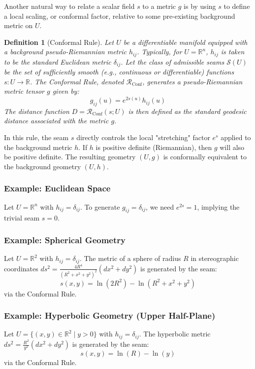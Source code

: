 \documentclass[twoside,twocolumn]{article}
\newtheorem{definition}{Definition}[subsection] %
\begin{document}
Another natural way to relate a scalar field $s$ to a metric $g$ is by using $s$ to define a local scaling, or conformal factor, relative to some pre-existing background metric on $U$.

\begin{definition}[Conformal Rule]
Let $U$ be a differentiable manifold equipped with a background pseudo-Riemannian metric $h_{ij}$. Typically, for $U=\mathbb{R}^n$, $h_{ij}$ is taken to be the standard Euclidean metric $\delta_{ij}$. Let the class of admissible seams $\mathcal{S}(U)$ be the set of sufficiently smooth (e.g., continuous or differentiable) functions $s: U \to \mathbb{R}$. The \emph{Conformal Rule}, denoted $\mathcal{R}_{\text{Conf}}$, generates a pseudo-Riemannian metric tensor $g$ given by:
\begin{equation}
g_{ij}(u) = e^{2s(u)} h_{ij}(u)
\label{eq:conformal_rule}
\end{equation}
The distance function $D = \mathcal{R}_{\text{Conf}}(s; U)$ is then defined as the standard geodesic distance associated with the metric $g$.
\end{definition}

\noindent In this rule, the seam $s$ directly controls the local "stretching" factor $e^s$ applied to the background metric $h$. If $h$ is positive definite (Riemannian), then $g$ will also be positive definite. The resulting geometry $(U, g)$ is conformally equivalent to the background geometry $(U, h)$.

\subsubsection{Example: Euclidean Space}
Let $U = \mathbb{R}^n$ with $h_{ij} = \delta_{ij}$. To generate $g_{ij} = \delta_{ij}$, we need $e^{2s} = 1$, implying the trivial seam $s=0$.

\subsubsection{Example: Spherical Geometry}
Let $U = \mathbb{R}^2$ with $h_{ij} = \delta_{ij}$. The metric of a sphere of radius $R$ in stereographic coordinates $ds^2 = \frac{4R^4}{(R^2 + x^2 + y^2)^2}(dx^2 + dy^2)$ is generated by the seam:
$$ s(x, y) = \ln(2R^2) - \ln(R^2 + x^2 + y^2) $$
via the Conformal Rule.

\subsubsection{Example: Hyperbolic Geometry (Upper Half-Plane)}
Let $U = \{ (x, y) \in \mathbb{R}^2 \mid y > 0 \}$ with $h_{ij} = \delta_{ij}$. The hyperbolic metric $ds^2 = \frac{R^2}{y^2} (dx^2 + dy^2)$ is generated by the seam:
$$ s(x, y) = \ln(R) - \ln(y) $$
via the Conformal Rule.
\end{document}
